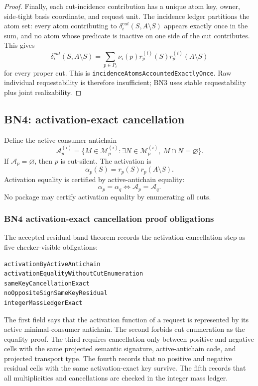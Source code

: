 \documentclass[10.5pt,a4paper]{article}
\begin{document}
\begin{proof}
Finally, each cut-incidence contribution has a unique atom key, owner, side-tight basis coordinate, and request unit.  The incidence ledger partitions the atom set: every atom contributing to \(\delta_i^{cut}(S,A\setminus S)\) appears exactly once in the sum, and no atom whose predicate is inactive on one side of the cut contributes.  This gives
\[
\delta_i^{cut}(S,A\setminus S)=
\sum_{p\in P_i}\nu_i(p)r_p^{(i)}(S)r_p^{(i)}(A\setminus S)
\]
for every proper cut.  This is \texttt{incidenceAtomsAccountedExactlyOnce}.  Raw individual requestability is therefore insufficient; BN3 uses stable requestability plus joint realizability.
\end{proof}

\subsection{BN4: activation-exact cancellation}
Define the active consumer antichain
\[
\mathcal A_p^{(i)}=\{M\in\mathcal M_p^{(i)}:\exists N\in\mathcal M_p^{(i)},\ M\cap N=\varnothing\}.
\]
If \(\mathcal A_p=\varnothing\), then \(p\) is cut-silent. The activation is
\[
\alpha_p(S)=r_p(S)r_p(A\setminus S).
\]
Activation equality is certified by active-antichain equality:
\[
\alpha_p=\alpha_q\Longleftrightarrow \mathcal A_p=\mathcal A_q.
\]
No package may certify activation equality by enumerating all cuts.

\subsubsection{BN4 activation-exact cancellation proof obligations}
The accepted residual-band theorem records the activation-cancellation step as five checker-visible obligations:
\begin{lstlisting}
activationByActiveAntichain
activationEqualityWithoutCutEnumeration
sameKeyCancellationExact
noOppositeSignSameKeyResidual
integerMassLedgerExact
\end{lstlisting}
The first field says that the activation function of a request is represented by its active minimal-consumer antichain.  The second forbids cut enumeration as the equality proof.  The third requires cancellation only between positive and negative cells with the same projected semantic signature, active-antichain code, and projected transport type.  The fourth records that no positive and negative residual cells with the same activation-exact key survive.  The fifth records that all multiplicities and cancellations are checked in the integer mass ledger.
\end{document}
